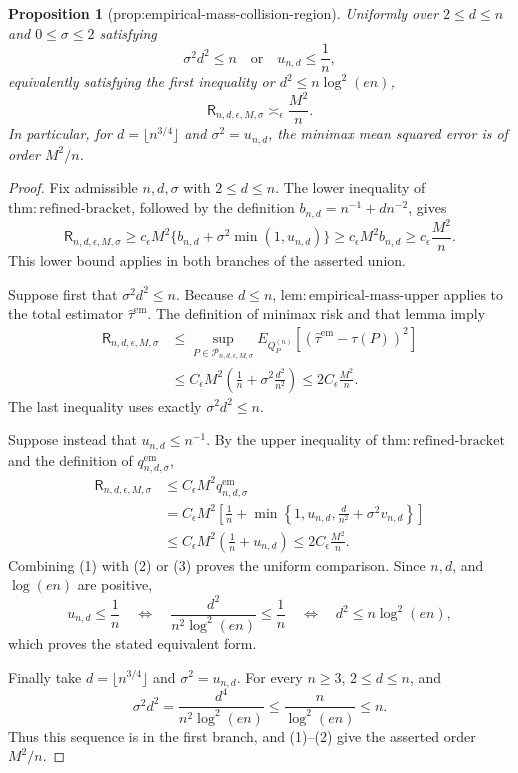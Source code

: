 \documentclass{article}
\newtheorem{proposition}{Proposition}
\begin{document}
\begin{proposition}[prop:empirical-mass-collision-region]\label{prop:empirical-mass-collision-region}
Uniformly over \(2\le d\le n\) and \(0\le\sigma\le2\) satisfying
\[
 \sigma^2d^2\le n
 \quad\text{or}\quad
 u_{n,d}\le \frac1n,
\]
equivalently satisfying the first inequality or \(d^2\le n\log^2(en)\),
\[
 \mathsf R_{n,d,\epsilon,M,\sigma}\asymp_{\epsilon}\frac{M^2}{n}.
\]
In particular, for \(d=\lfloor n^{3/4}\rfloor\) and \(\sigma^2=u_{n,d}\), the minimax mean squared error is of order \(M^2/n\).
\end{proposition}
\begin{proof}
Fix admissible \(n,d,\sigma\) with \(2\le d\le n\).  The lower inequality of \(\mathrm{thm:refined\text{-}bracket}\), followed by the definition \(b_{n,d}=n^{-1}+dn^{-2}\), gives
\[
 \mathsf R_{n,d,\epsilon,M,\sigma}
 \ge c_{\epsilon}M^2\{b_{n,d}+\sigma^2\min(1,u_{n,d})\}
 \ge c_{\epsilon}M^2b_{n,d}
 \ge c_{\epsilon}\frac{M^2}{n}.                                      \tag{1}
\]
This lower bound applies in both branches of the asserted union.

Suppose first that \(\sigma^2d^2\le n\).  Because \(d\le n\), \(\mathrm{lem:empirical\text{-}mass\text{-}upper}\) applies to the total estimator \(\widehat\tau^{\mathrm{em}}\).  The definition of minimax risk and that lemma imply
\[
 \begin{aligned}
 \mathsf R_{n,d,\epsilon,M,\sigma}
 &\le \sup_{P\in\mathcal P_{n,d,\epsilon,M,\sigma}}
 E_{Q_P^{(n)}}[(\widehat\tau^{\mathrm{em}}-\tau(P))^2]\\
 &\le C_{\epsilon}M^2\left(\frac1n+\sigma^2\frac{d^2}{n^2}\right)
 \le 2C_{\epsilon}\frac{M^2}{n}.                                    \tag{2}
 \end{aligned}
\]
The last inequality uses exactly \(\sigma^2d^2\le n\).

Suppose instead that \(u_{n,d}\le n^{-1}\).  By the upper inequality of \(\mathrm{thm:refined\text{-}bracket}\) and the definition of \(q_{n,d,\sigma}^{\mathrm{em}}\),
\[
 \begin{aligned}
 \mathsf R_{n,d,\epsilon,M,\sigma}
 &\le C_{\epsilon}M^2q_{n,d,\sigma}^{\mathrm{em}}\\
 &=C_{\epsilon}M^2\left[\frac1n+
 \min\left\{1,u_{n,d},\frac d{n^2}+\sigma^2v_{n,d}\right\}\right]\\
 &\le C_{\epsilon}M^2\left(\frac1n+u_{n,d}\right)
 \le 2C_{\epsilon}\frac{M^2}{n}.                                    \tag{3}
 \end{aligned}
\]
Combining (1) with (2) or (3) proves the uniform comparison.  Since \(n,d\), and \(\log(en)\) are positive,
\[
 u_{n,d}\le\frac1n
 \quad\Longleftrightarrow\quad
 \frac{d^2}{n^2\log^2(en)}\le\frac1n
 \quad\Longleftrightarrow\quad
 d^2\le n\log^2(en),                                                   \tag{4}
\]
which proves the stated equivalent form.

Finally take \(d=\lfloor n^{3/4}\rfloor\) and \(\sigma^2=u_{n,d}\).  For every \(n\ge3\), \(2\le d\le n\), and
\[
 \sigma^2d^2
 =\frac{d^4}{n^2\log^2(en)}
 \le\frac{n}{\log^2(en)}
 \le n.                                                               \tag{5}
\]
Thus this sequence is in the first branch, and (1)--(2) give the asserted order \(M^2/n\).
\end{proof}
\end{document}
